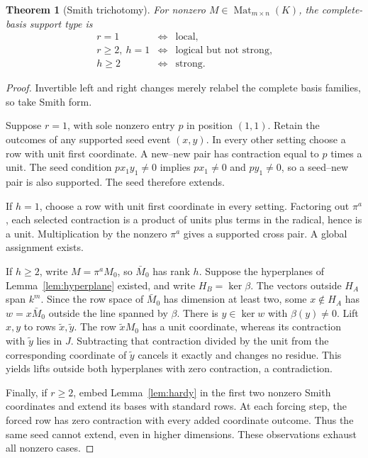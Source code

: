 \documentclass[11pt]{article}
\newtheorem{theorem}{Theorem}[section]
\theoremstyle{definition}\newtheorem{definition}[theorem]{Definition}
\theoremstyle{remark}\newtheorem{remark}[theorem]{Remark}
\DeclareMathOperator{\Mat}{Mat}
\begin{document}
\begin{theorem}[Smith trichotomy]\label{thm:trichotomy}
For nonzero $M\in\Mat_{m\times n}(K)$, the complete-basis support type is
\[
\begin{array}{rcl}
r=1&\Longleftrightarrow&\text{local},\\
r\geq2,\ h=1&\Longleftrightarrow&\text{logical but not strong},\\
h\geq2&\Longleftrightarrow&\text{strong}.
\end{array}
\]
\end{theorem}
\begin{proof}
Invertible left and right changes merely relabel the complete basis families, so take Smith form.

Suppose $r=1$, with sole nonzero entry $p$ in position $(1,1)$. Retain the outcomes of any supported seed event $(x,y)$. In every other setting choose a row with unit first coordinate. A new--new pair has contraction equal to $p$ times a unit. The seed condition $px_1y_1\ne0$ implies $px_1\ne0$ and $py_1\ne0$, so a seed--new pair is also supported. The seed therefore extends.

If $h=1$, choose a row with unit first coordinate in every setting. Factoring out $\pi^a$, each selected contraction is a product of units plus terms in the radical, hence is a unit. Multiplication by the nonzero $\pi^a$ gives a supported cross pair. A global assignment exists.

If $h\geq2$, write $M=\pi^a M_0$, so $\bar M_0$ has rank $h$. Suppose the hyperplanes of Lemma~\ref{lem:hyperplane} existed, and write $H_B=\ker\beta$. The vectors outside $H_A$ span $k^m$. Since the row space of $\bar M_0$ has dimension at least two, some $x\notin H_A$ has $w=x\bar M_0$ outside the line spanned by $\beta$. There is $y\in\ker w$ with $\beta(y)\ne0$. Lift $x,y$ to rows $\tilde x,\tilde y$. The row $\tilde xM_0$ has a unit coordinate, whereas its contraction with $\tilde y$ lies in $J$. Subtracting that contraction divided by the unit from the corresponding coordinate of $\tilde y$ cancels it exactly and changes no residue. This yields lifts outside both hyperplanes with zero contraction, a contradiction.

Finally, if $r\geq2$, embed Lemma~\ref{lem:hardy} in the first two nonzero Smith coordinates and extend its bases with standard rows. At each forcing step, the forced row has zero contraction with every added coordinate outcome. Thus the same seed cannot extend, even in higher dimensions. These observations exhaust all nonzero cases.
\end{proof}
\end{document}
